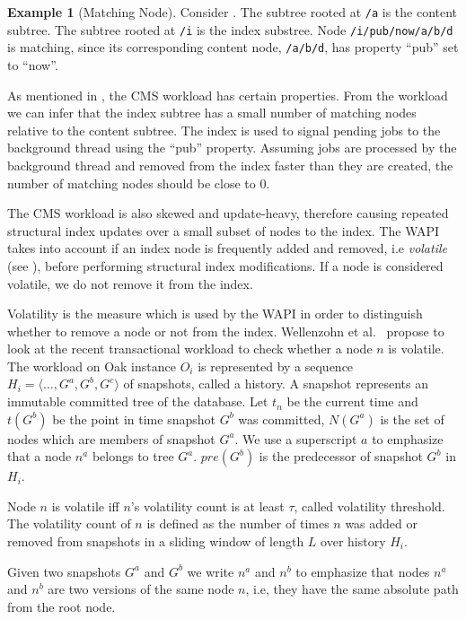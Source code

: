 \documentclass[abstracton,12pt]{scrartcl}
\theoremstyle{definition}
\newtheorem{example}{Example}
\begin{document}
\begin{example}[Matching Node]
  Consider . The subtree rooted at \texttt{/a} is
  the content subtree. The subtree rooted at \texttt{/i} is the index
  substree. Node \texttt{/i/pub/now/a/b/d} is matching, since its corresponding
  content node, \texttt{/a/b/d}, has property ``pub'' set to ``now''.
\end{example}

As mentioned in , the CMS workload has certain
properties. From the workload we can infer that the index subtree has a small number of
matching nodes relative to the content subtree. The index is
 used to signal pending jobs to the background thread using
the ``pub'' property. Assuming jobs are processed by
the background thread and removed from the index faster than they are created,
the number of matching nodes should be close to $0$.  

The CMS workload is also skewed and update-heavy, therefore causing repeated structural index
updates over a small subset of nodes to the index.
The WAPI takes into account if an index node is frequently added and removed,
i.e \textit{volatile} (see ), before performing structural
index modifications. If a node is considered volatile, we do not remove it from the index.

Volatility is the measure which is used by the WAPI in order to distinguish
whether to remove a node or not from the index.
Wellenzohn et al.~\cite{KW17} propose to look at the recent transactional
workload to check whether a node $n$ is volatile. The workload on Oak instance
$O_i$ is represented by a sequence $H_i = \langle \ldots, G^a, G^b, G^c
\rangle$ of snapshots, called a history. A snapshot represents an immutable
committed tree of the database. Let $t_n$ be the current time and
$t(G^b)$ be the point in time snapshot $G^b$ was committed, $N(G^a)$ is the
set of nodes which are members of snapshot $G^a$. We use a superscript $a$
to emphasize that a node $n^a$ belongs to tree $G^a$. $pre(G^b)$ is the
predecessor of snapshot $G^b$ in $H_i$.

Node $n$ is volatile iff $n$'s volatility count is at least $\tau$, called
volatility threshold. The volatility count of $n$ is defined as the number of
times $n$ was added or removed from snapshots in a sliding window of length
$L$ over history $H_i$.

Given two snapshots $G^a$ and $G^b$ we write $n^a$ and $n^b$ to emphasize that
nodes $n^a$ and $n^b$ are two versions of the same node $n$, i.e, they have
the same absolute path from the root node.
\end{document}
